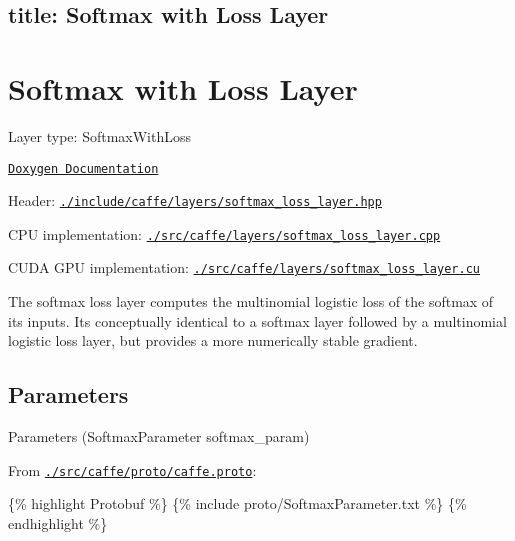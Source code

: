

 \subsection*{title\+: Softmax with Loss Layer }

\section*{Softmax with Loss Layer}


\begin{DoxyItemize}
\item Layer type\+: {\ttfamily Softmax\+With\+Loss}
\item \href{http://caffe.berkeleyvision.org/doxygen/classcaffe_1_1SoftmaxWithLossLayer.html}{\tt Doxygen Documentation}
\item Header\+: \href{https://github.com/BVLC/caffe/blob/master/include/caffe/layers/softmax_loss_layer.hpp}{\tt {\ttfamily ./include/caffe/layers/softmax\+\_\+loss\+\_\+layer.hpp}}
\item C\+PU implementation\+: \href{https://github.com/BVLC/caffe/blob/master/src/caffe/layers/softmax_loss_layer.cpp}{\tt {\ttfamily ./src/caffe/layers/softmax\+\_\+loss\+\_\+layer.cpp}}
\item C\+U\+DA G\+PU implementation\+: \href{https://github.com/BVLC/caffe/blob/master/src/caffe/layers/softmax_loss_layer.cu}{\tt {\ttfamily ./src/caffe/layers/softmax\+\_\+loss\+\_\+layer.cu}}
\end{DoxyItemize}

The softmax loss layer computes the multinomial logistic loss of the softmax of its inputs. It\textquotesingle{}s conceptually identical to a softmax layer followed by a multinomial logistic loss layer, but provides a more numerically stable gradient.

\subsection*{Parameters}


\begin{DoxyItemize}
\item Parameters ({\ttfamily Softmax\+Parameter softmax\+\_\+param})
\item From \href{https://github.com/BVLC/caffe/blob/master/src/caffe/proto/caffe.proto}{\tt {\ttfamily ./src/caffe/proto/caffe.proto}}\+:
\end{DoxyItemize}

\{\% highlight Protobuf \%\} \{\% include proto/\+Softmax\+Parameter.\+txt \%\} \{\% endhighlight \%\}


